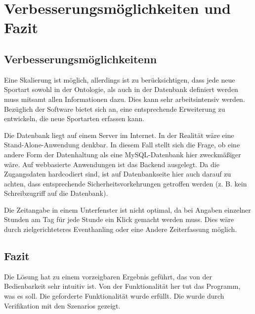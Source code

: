 \chapter{Verbesserungsmöglichkeiten und Fazit}

\section{Verbesserungsmöglichkeitenn}

Eine Skalierung ist möglich, allerdings ist zu berücksichtigen, dass jede neue Sportart sowohl in der Ontologie, als auch in der Datenbank definiert werden muss mitsamt allen Informationen dazu. Dies kann sehr arbeitsintensiv werden. Bezüglich der Software bietet sich an, eine entsprechende Erweiterung zu entwickeln, die neue Sportarten erfassen kann. 

Die Datenbank liegt auf einem Server im Internet. In der Realität wäre eine Stand-Alone-Anwendung denkbar. In diesem Fall stellt sich die Frage, ob eine andere Form der Datenhaltung als eine MySQL-Datenbank hier zweckmäßiger wäre. Auf webbasierte Anwendungen ist das Backend ausgelegt. Da die Zugangsdaten hardcodiert sind, ist auf Datenbankseite hier auch darauf zu achten, dass entsprechende Sicherheitsvorkehrungen getroffen werden (z. B. kein Schreibzugriff auf die Datenbank).

Die Zeitangabe in einem Unterfenster ist nicht optimal, da bei Angaben einzelner Stunden am Tag für jede Stunde ein Klick gemacht werden muss. Dies wäre durch zielgerichteteres Eventhanling oder eine Andere Zeiterfassung möglich.

\section{Fazit}

Die Lösung hat zu einem vorzeigbaren Ergebnis geführt, das von der Bedienbarkeit sehr intuitiv ist. Von der Funktionalität her tut das Programm, was es soll. Die geforderte Funktionalität wurde erfüllt. Die wurde durch Verifikation mit den Szenarios gezeigt.